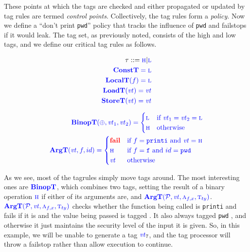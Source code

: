 \documentclass{llncs}
\begin{document}
These points at which the tags are checked and either propagated or updated by tag rules are termed
{\em control points}. Collectively, the tag rules form a {\em policy}. Now we define a
``don't print {\tt pwd}'' policy that tracks the influence of {\tt pwd} and failstops if it would
leak. The tag set, as previously noted, consists of the high and low tags, and we define our critical
tag rules as follows.

\begin{minipage}{0.3\textwidth}
  \begin{align*}
  \tau::=\high | \low \\
  \constt = \low \\
  \localtname(f) = \low \\
  \loadtname(\vt) = \vt \\
  \storetname(\vt) = \vt \\
  \end{align*}
\end{minipage}
\begin{minipage}{0.6\textwidth}
\begin{align*}
  \binoptname(\oplus,\vt_1,\vt_2) = \begin{cases} \low & \textnormal{if } \vt_1 = \vt_2 = \low \\
    \high & \textnormal{otherwise} \end{cases}\\
  \argtname(\vt, f, id) = \begin{cases} \fail & \textnormal{if } f=\mathtt{printi} \textnormal{ and } \vt = \high \\
    \high & \textnormal{if } f=\mathtt{f} \textnormal{ and } id = \mathtt{pwd} \\
    \vt & \textnormal{otherwise} \\
  \end{cases} \\
\end{align*}
\end{minipage}

As we see, most of the tagrules simply move tags around. The most interesting ones are \(\binoptname\),
which combines two tags, setting the result of a binary operation \(\high\) if either of its arguments are,
and \(\argt\). \(\argt\) checks whether the function being called is {\tt printi} and fails if it is
and the value being passed is tagged \high. It also always tagged {\tt pwd} \high, and otherwise it just maintains
the security level of the input it is given. So, in this example, we will be unable to generate a tag
\(\vt_7\), and the tag processor will throw a failstop rather than allow execution to continue.
\end{document}
